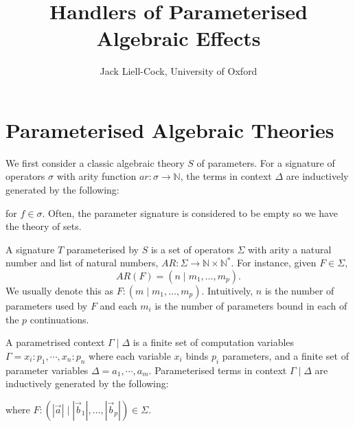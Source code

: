 \documentclass{scrartcl}
\title{Handlers of Parameterised Algebraic Effects}
\author{Jack Liell-Cock, University of Oxford}
\date{}
\theoremstyle{definition}
\begin{document}
\maketitle

\section{Parameterised Algebraic Theories}

We first consider a classic algebraic theory $S$ of parameters. For a signature of operators $\sigma$ with arity function $ar : \sigma \to \mathbb{N}$, the terms in context $\Delta$ are inductively generated by the following:
\begin{prooftree}
\end{prooftree}
\begin{prooftree}
\end{prooftree}
for $f\in\sigma$. Often, the parameter signature is considered to be empty so we have the theory of sets.

A signature $T$ parameterised by $S$ is a set of operators $\Sigma$ with arity a natural number and list of natural numbers, $AR: \Sigma \to \mathbb{N} \times \mathbb{N}^*$. For instance, given $F\in\Sigma$,
\[AR(F) = (n\mid m_1,\dots,m_p).\]
We usually denote this as $F : (m\mid m_1,\dots,m_p)$. Intuitively, $n$ is the number of parameters used by $F$ and each $m_i$ is the number of parameters bound in each of the $p$ continuations.

A parametrised context $\Gamma\mid\Delta$ is a finite set of computation variables $\Gamma = x_i:p_1,\cdots,x_n:p_n$ where each variable $x_i$ binds $p_i$ parameters, and a finite set of parameter variables $\Delta = a_1,\cdots,a_m$. Parameterised terms in context $\Gamma\mid\Delta$ are inductively generated by the following:
\begin{prooftree}
\end{prooftree}
\begin{prooftree}
\end{prooftree}
where $F:(|\vec{a}| \mid |\vec{b}_1|,\dots,|\vec{b}_p|) \in \Sigma$.
\end{document}
